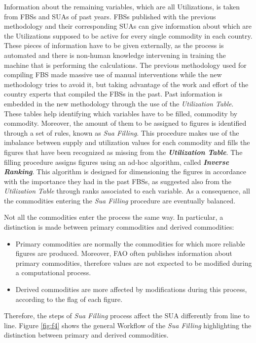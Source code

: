 \documentclass[]{article}
\providecommand{\tightlist}{%
  \setlength{\itemsep}{0pt}\setlength{\parskip}{0pt}}
\begin{document}
Information about the remaining variables, which are all Utilizations,
is taken from FBSs and SUAs of past years. FBSs published with the
previous methodology and their corresponding SUAs can give information
about which are the Utilizations supposed to be active for every single
commodity in each country.\\
These pieces of information have to be given externally, as the process
is automated and there is non-human knowledge intervening in training
the machine that is performing the calculations. The previous
methodology used for compiling FBS made massive use of manual
interventions while the new methodology tries to avoid it, but taking
advantage of the work and effort of the country experts that compiled
the FBSs in the past. Past information is embedded in the new
methodology through the use of the \emph{Utilization Table}. These
tables help identifying which variables have to be filled, commodity by
commodity. Moreover, the amount of them to be assigned to figures is
identified through a set of rules, known as \emph{Sua Filling}. This
procedure makes use of the imbalance between supply and utilization
values for each commodity and fills the figures that have been
recognized as missing from the \textbf{\emph{Utilization Table}}. The
filling procedure assigns figures using an ad-hoc algorithm, called
\textbf{\emph{Inverse Ranking}}. This algorithm is designed for
dimensioning the figures in accordance with the importance they had in
the past FBSs, as suggested also from the \emph{Utilization Table}
through ranks associated to each variable. As a consequence, all the
commodities entering the \emph{Sua Filling} procedure are eventually
balanced.

Not all the commodities enter the process the same way. In particular, a
distinction is made between primary commodities and derived commodities:

\begin{itemize}
\tightlist
\item
  Primary commodities are normally the commodities for which more
  reliable figures are produced. Moreover, FAO often publishes
  information about primary commodities, therefore values are not
  expected to be modified during a computational process.
\item
  Derived commodities are more affected by modifications during this
  process, according to the flag of each figure.
\end{itemize}

Therefore, the steps of \emph{Sua Filling} process affect the SUA
differently from line to line. Figure \ref{fig:f4} shows the general
Workflow of the \emph{Sua Filling} highlighting the distinction between
primary and derived commodities.
\end{document}
